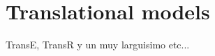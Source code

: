 \section{Translational models}\label{sec:emb-translations}

TransE, TransR y un muy larguisimo etc...





